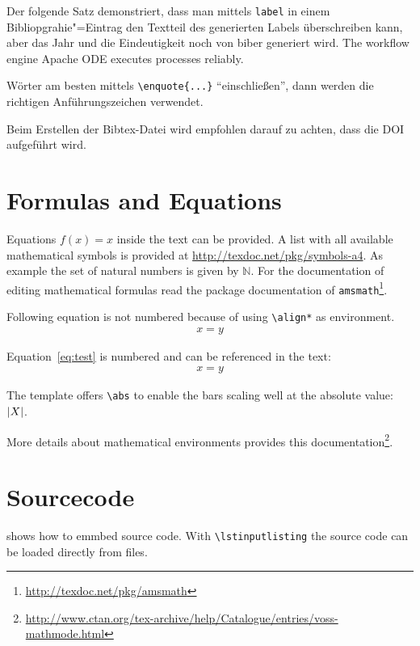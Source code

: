 Der folgende Satz demonstriert, dass man mittels \texttt{label} in einem Bibliopgrahie"=Eintrag den Textteil des generierten Labels überschreiben kann, aber das Jahr und die Eindeutigkeit noch von biber generiert wird.
The workflow engine Apache ODE \cite{ApacheODE} executes \BPEL processes reliably.

Wörter am besten mittels \texttt{\textbackslash enquote\{...\}} \enquote{einschließen}, dann werden die richtigen Anführungszeichen verwendet.

Beim Erstellen der Bibtex-Datei wird empfohlen darauf zu achten, dass die DOI aufgeführt wird.

\section{Formulas and Equations}
\label{sec:mf}
Equations $f(x)=x$ inside the text can be provided.
A list with all available mathematical symbols is provided at \url{http://texdoc.net/pkg/symbols-a4}.
As example the set of natural numbers is given by $\mathbb{N}$.
For the documentation of editing mathematical formulas read the package documentation of \texttt{amsmath}\footnote{\url{http://texdoc.net/pkg/amsmath}}.

Following equation is not numbered because of using \texttt{\textbackslash align*} as environment.
\begin{align*}
  x = y
\end{align*}

Equation~\ref{eq:test} is numbered and can be referenced in the text:
\begin{align}
  \label{eq:test}
  x = y
\end{align}

The template offers \verb+\abs+ to enable the bars scaling well at the absolute value:
$\left\lvert X\right\rvert$.

More details about mathematical environments provides this documentation\footnote{\url{http://www.ctan.org/tex-archive/help/Catalogue/entries/voss-mathmode.html}}.
\section{Sourcecode}
 shows how to emmbed source code.
With \texttt{\textbackslash lstinputlisting} the source code can be loaded directly from files.

